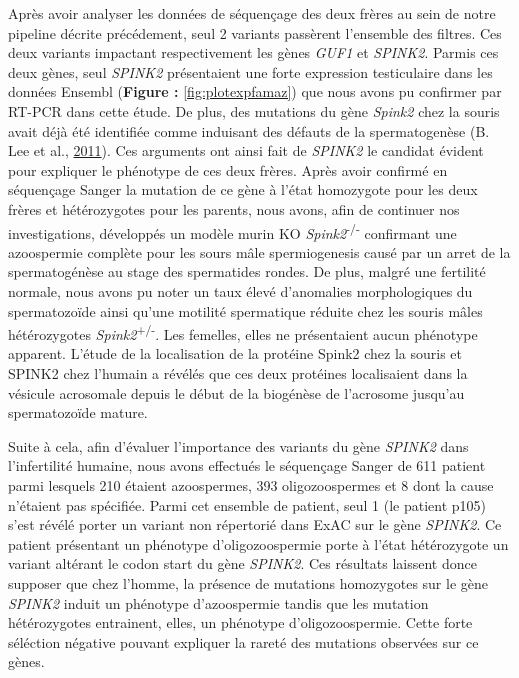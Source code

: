 \documentclass[12pt,twoside]{reedthesis}
\theoremstyle{definition}
\theoremstyle{definition}
\theoremstyle{remark}
\begin{document}
  Après avoir analyser les données de séquençage des deux frères au sein
  de notre pipeline décrite précédement, seul 2 variants passèrent
  l'ensemble des filtres. Ces deux variants impactant respectivement les
  gènes \emph{GUF1} et \emph{SPINK2}. Parmis ces deux gènes, seul
  \emph{SPINK2} présentaient une forte expression testiculaire dans les
  données Ensembl (\textbf{Figure : }\ref{fig:plotexpfamaz}) que nous
  avons pu confirmer par RT-PCR dans cette étude. De plus, des mutations
  du gène \emph{Spink2} chez la souris avait déjà été identifiée comme
  induisant des défauts de la spermatogenèse (B. Lee et al.,
  \protect\hyperlink{ref-Lee2011}{2011}). Ces arguments ont ainsi fait de
  \emph{SPINK2} le candidat évident pour expliquer le phénotype de ces
  deux frères. Après avoir confirmé en séquençage Sanger la mutation de ce
  gène à l'état homozygote pour les deux frères et hétérozygotes pour les
  parents, nous avons, afin de continuer nos investigations, développés un
  modèle murin KO \emph{Spink2}\textsuperscript{-/-} confirmant une
  azoospermie complète pour les sours mâle spermiogenesis causé par un
  arret de la spermatogénèse au stage des spermatides rondes. De plus,
  malgré une fertilité normale, nous avons pu noter un taux élevé
  d'anomalies morphologiques du spermatozoïde ainsi qu'une motilité
  spermatique réduite chez les souris mâles hétérozygotes
  \emph{Spink2}\textsuperscript{+/-}. Les femelles, elles ne présentaient
  aucun phénotype apparent. L'étude de la localisation de la protéine
  Spink2 chez la souris et SPINK2 chez l'humain a révélés que ces deux
  protéines localisaient dans la vésicule acrosomale depuis le début de la
  biogénèse de l'acrosome jusqu'au spermatozoïde mature.
  
  Suite à cela, afin d'évaluer l'importance des variants du gène
  \emph{SPINK2} dans l'infertilité humaine, nous avons effectués le
  séquençage Sanger de 611 patient parmi lesquels 210 étaient azoospermes,
  393 oligozoospermes et 8 dont la cause n'étaient pas spécifiée. Parmi
  cet ensemble de patient, seul 1 (le patient p105) s'est révélé porter un
  variant non répertorié dans ExAC sur le gène \emph{SPINK2}. Ce patient
  présentant un phénotype d'oligozoospermie porte à l'état hétérozygote un
  variant altérant le codon start du gène \emph{SPINK2}. Ces résultats
  laissent donce supposer que chez l'homme, la présence de mutations
  homozygotes sur le gène \emph{SPINK2} induit un phénotype d'azoospermie
  tandis que les mutation hétérozygotes entrainent, elles, un phénotype
  d'oligozoospermie. Cette forte séléction négative pouvant expliquer la
  rareté des mutations observées sur ce gènes.
  
\end{document}
